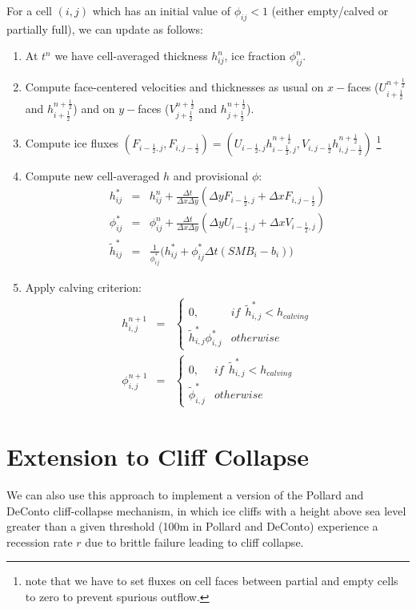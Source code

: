 \documentclass[12pt]{article}
\newcommand{\half}{\frac{1}{2}}
\begin{document}
For a cell $(i,j)$ which has an initial value of $\phi_{ij} < 1$ (either empty/calved or partially full), we can update as follows:
\begin{enumerate}
\item At $t^n$ we have cell-averaged thickness $h^n_{ij}$, ice fraction $\phi^n_{ij}$.
\item Compute face-centered velocities and thicknesses as usual on $x-$faces ($U^{n+\half}_{i+\half}$ and $h^{n+\half}_{i+\half}$) and on $y-$faces ($V^{n+\half}_{j+\half}$ and $h^{n+\half}_{j+\half}$).
\item Compute ice fluxes $(F_{i-\half,j}, F_{i, j-\half}) = (U_{i-\half,j}h^{n+\half}_{i-\half,j}, V_{i, j-\half}h^{n+\half}_{i, j-\half})$ \footnote{note that we have to set fluxes on cell faces between partial and empty cells to zero to prevent spurious outflow.}
\item Compute new cell-averaged $h$ and provisional $\phi$:
\begin{eqnarray} 
h^*_{ij} & = & h^n_{ij} + \frac{\Delta t}{\Delta x \Delta y}  (\Delta y F_{i-\half,j} + \Delta x F_{i,j-\half}) \\
\phi^*_{ij} & = & \phi^n_{ij} + \frac{\Delta t}{\Delta x \Delta y}(\Delta y U_{i-\half,j} + \Delta x V_{i-\half,j})  \nonumber \\
\tilde{h}^*_{ij} & = & \frac{1}{\phi^*_{ij}} \bigl( h^*_{ij} + \phi^*_{ij}\Delta t (SMB_i - b_i) \bigr) 
\end{eqnarray}

\item Apply calving criterion:
\begin{eqnarray}
h^{n+1}_{i,j} & = & \begin{cases}
0, & if \ \  \tilde{h}^*_{i,j} < h_{calving} \\
 \tilde{h}^*_{i,j}\phi^{*}_{i,j} & otherwise 
\end{cases} 
\label{eqn:calvingLaw2D} \\
\phi^{n+1}_{i,j} & = & \begin{cases}
0, & if \ \  \tilde{h}^*_{i,j} < h_{calving} \\
 \tilde{\phi}^*_{i,j} & otherwise \nonumber
\end{cases} 
\end{eqnarray}

\end{enumerate}

\section{Extension to Cliff Collapse}
We can also use this approach to implement a version of the Pollard and DeConto cliff-collapse mechanism, in which ice cliffs with a height above sea level greater than a given threshold (100m in Pollard and DeConto) experience a recession rate $r$ due to brittle failure leading to cliff collapse.
\end{document}
